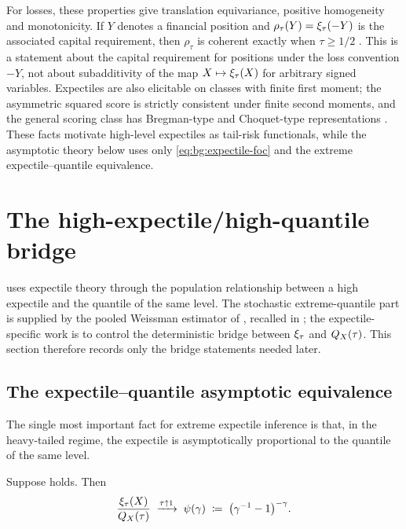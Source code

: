 For losses, these properties give translation equivariance, positive
homogeneity and monotonicity. If $Y$ denotes a financial position and
$\rho_{\tau}(Y)=\xi_{\tau}(-Y)$ is the associated capital
requirement, then $\rho_\tau$ is coherent exactly when
$\tau\ge 1/2$ \parencite{BelliniKlarMullerRosazzaGianin2014}.
This is a statement about the capital requirement for positions under the
loss convention \( -Y \), not about subadditivity of the map
\(X\mapsto\xi_{\tau}(X)\) for arbitrary signed variables.
Expectiles are also elicitable on classes with finite first moment; the
asymmetric squared score is strictly consistent under finite second
moments, and the general scoring class has Bregman-type and
Choquet-type representations
\parencite{Gneiting2011,EhmGneitingJordanKrueger2016}. These facts
motivate high-level expectiles as tail-risk functionals, while the
asymptotic theory below uses only \eqref{eq:bg:expectile-foc} and the
extreme expectile--quantile equivalence.

\section{The high-expectile/high-quantile bridge}
\label{sec:bg:extreme-expectile}

 uses expectile theory through the population
relationship between a high expectile and the quantile of the same
level. The stochastic extreme-quantile part is supplied by the pooled
Weissman estimator of \textcite[\S2.3]{DaouiaPadoanStupfler2021},
recalled in ; the expectile-specific work is to
control the deterministic bridge between $\xi_{\tau}$ and
$Q_X(\tau)$. This section therefore records only the bridge
statements needed later.

\subsection{The expectile--quantile asymptotic equivalence}

The single most important fact for extreme expectile inference is
that, in the heavy-tailed regime, the expectile is asymptotically
proportional to the quantile of the same level.

\begin{proposition}[Asymptotic equivalence;
                    \textcite{BelliniKlarMullerRosazzaGianin2014},
                    \textcite{DaouiaGirardStupfler2019}, Corollary~1 with $p=2$]
\label{prop:bg:expectile-quantile}
Suppose  holds. Then
\begin{equation}
\label{eq:bg:expectile-quantile-equivalence}
  \frac{\xi_{\tau}(X)}{Q_{X}(\tau)}
  \;\xrightarrow{\tau \uparrow 1}\;
  \psi(\gamma) \;\coloneqq\; \big(\gamma^{-1} - 1\big)^{-\gamma}.
\end{equation}
\end{proposition}

